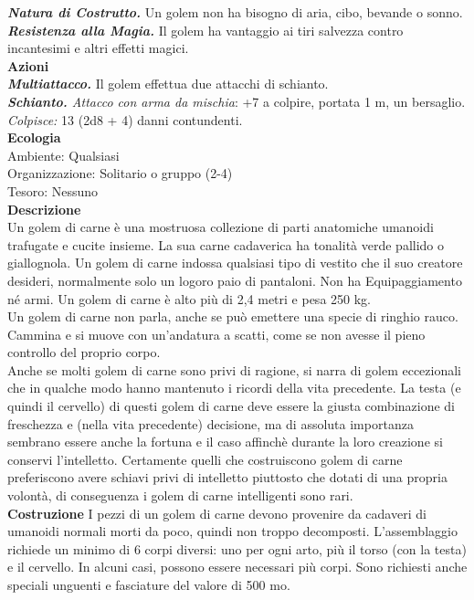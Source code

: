 \begin{multicols}{2}
\emph{\textbf{Natura di Costrutto.}} Un golem non ha bisogno di aria, cibo, bevande o sonno.\\
\emph{\textbf{Resistenza alla Magia.}} Il golem ha vantaggio ai tiri salvezza contro incantesimi e altri effetti magici.\\
\smallskip\textbf{Azioni}\\
\emph{\textbf{Multiattacco.}} Il golem effettua due attacchi di schianto.\\
\emph{\textbf{Schianto.} Attacco con arma da mischia}: +7 a colpire, portata 1 m, un bersaglio.\\
\emph{Colpisce:} 13 (2d8 + 4) danni contundenti.\\
\textbf{Ecologia}\\
Ambiente: Qualsiasi\\
Organizzazione: Solitario o gruppo (2-4)\\
Tesoro: Nessuno\\
\textbf{Descrizione}\\
Un golem di carne è una mostruosa collezione di parti anatomiche umanoidi trafugate e cucite insieme. La sua carne cadaverica ha tonalità verde pallido o giallognola. Un golem di carne indossa qualsiasi tipo di vestito che il suo creatore desideri, normalmente solo un logoro paio di pantaloni. Non ha Equipaggiamento né armi. Un golem di carne è alto più di 2,4 metri e pesa 250 kg.\\

Un golem di carne non parla, anche se può emettere una specie di ringhio rauco. Cammina e si muove con un’andatura a scatti, come se non avesse il pieno controllo del proprio corpo.\\

Anche se molti golem di carne sono privi di ragione, si narra di golem eccezionali che in qualche modo hanno mantenuto i ricordi della vita precedente. La testa (e quindi il cervello) di questi golem di carne deve essere la giusta combinazione di freschezza e (nella vita precedente) decisione, ma di assoluta importanza sembrano essere anche la fortuna e il caso affinchè durante la loro creazione si conservi l’intelletto. Certamente quelli che costruiscono golem di carne preferiscono avere schiavi privi di intelletto piuttosto che dotati di una propria volontà, di conseguenza i golem di carne intelligenti sono rari.\\

\textbf{Costruzione}
I pezzi di un golem di carne devono provenire da cadaveri di umanoidi normali morti da poco, quindi non troppo decomposti. L’assemblaggio richiede un minimo di 6 corpi diversi: uno per ogni arto, più il torso (con la testa) e il cervello. In alcuni casi, possono essere necessari più corpi. Sono richiesti anche speciali unguenti e fasciature del valore di 500 mo.\\


\end{multicols}
